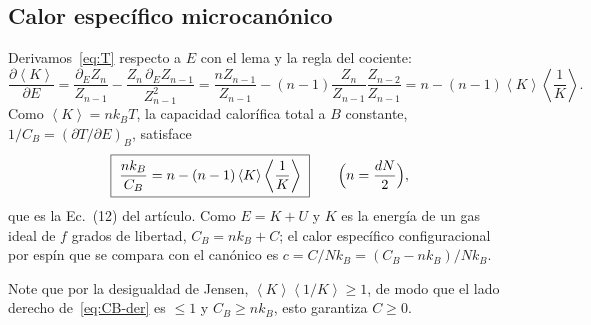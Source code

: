 \documentclass[11pt,letterpaper]{article}
\newcommand{\avg}[1]{\left\langle #1 \right\rangle}
\newcommand{\kB}{k_{B}}
\begin{document}
\subsection{Calor específico microcanónico}
Derivamos~\eqref{eq:T} respecto a $E$ con el lema y la regla del cociente:
\begin{equation}
\frac{\partial\avg K}{\partial E}
=\frac{\partial_EZ_n}{Z_{n-1}}-\frac{Z_n\,\partial_EZ_{n-1}}{Z_{n-1}^2}
=\frac{nZ_{n-1}}{Z_{n-1}}-(n-1)\frac{Z_n}{Z_{n-1}}\frac{Z_{n-2}}{Z_{n-1}}
=n-(n-1)\avg K\avg{\frac1K}.
\end{equation}
Como $\avg K=n\kB T$, la capacidad calorífica total a $B$ constante,
$1/C_B=(\partial T/\partial E)_B$, satisface
\begin{equation}
\boxed{\;\frac{n\kB}{C_B}=n-(n-1)\avg K\avg{\frac1K}\;}\qquad
\Bigl(n=\frac{dN}{2}\Bigr),
\label{eq:CB-der}
\end{equation}
que es la Ec.~(12) del artículo. Como $E=K+U$ y $K$ es la energía de un gas ideal
de $f$ grados de libertad, $C_B=n\kB+C$; el calor específico configuracional por
espín que se compara con el canónico es $c=C/N\kB=(C_B-n\kB)/N\kB$.

Note que por la desigualdad de Jensen, $\avg K\avg{1/K}\ge1$, de modo que el lado
derecho de~\eqref{eq:CB-der} es $\le1$ y $C_B\ge n\kB$, esto garantiza $C\ge0$.

\end{document}
